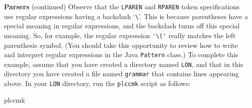 \begin{minipage}[t]{\sw}
\slidenumber
\LARGE
{\bf Parsers} (continued)\exx
\emm{\Large\LightBox{\MYlonGrammar}}\exx
Observe that the \verb'LPAREN' and \verb'RPAREN' token specifications
use regular expressions having a backslash `\verb'\''.
This is because parentheses have a special meaning in regular expressions,
and the backslash turns off this special meaning.
So, for example, the regular expression \verb.'\('.
really matches the left parenthesis symbol.
(You should take this opportunity
to review how to write and interpret regular expressions
in the Java \verb'Pattern' class.)\exx
To complete this example, 
assume that you have created a directory named \verb'LON',
and that in this directory you have created a file named \verb'grammar'
that contains lines appearing above.
In your \verb'LON' directory,
run the \verb'plccmk' script as follows:
\begin{qv}
plccmk
\end{qv}
\end{minipage}
\clearpage
